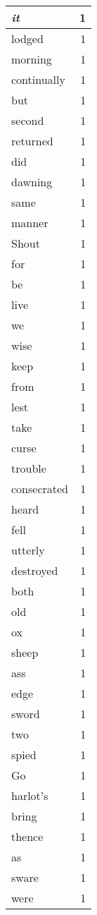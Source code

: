 \begin{center}
\begin{longtable}{l|r}
\emph{it} & 1 \\ \hline
lodged & 1 \\ \hline
morning & 1 \\ \hline
continually & 1 \\ \hline
but & 1 \\ \hline
second & 1 \\ \hline
returned & 1 \\ \hline
did & 1 \\ \hline
dawning & 1 \\ \hline
same & 1 \\ \hline
manner & 1 \\ \hline
Shout & 1 \\ \hline
for & 1 \\ \hline
be & 1 \\ \hline
live & 1 \\ \hline
we & 1 \\ \hline
wise & 1 \\ \hline
keep & 1 \\ \hline
from & 1 \\ \hline
lest & 1 \\ \hline
take & 1 \\ \hline
curse & 1 \\ \hline
trouble & 1 \\ \hline
consecrated & 1 \\ \hline
heard & 1 \\ \hline
fell & 1 \\ \hline
utterly & 1 \\ \hline
destroyed & 1 \\ \hline
both & 1 \\ \hline
old & 1 \\ \hline
ox & 1 \\ \hline
sheep & 1 \\ \hline
ass & 1 \\ \hline
edge & 1 \\ \hline
sword & 1 \\ \hline
two & 1 \\ \hline
spied & 1 \\ \hline
Go & 1 \\ \hline
harlot's & 1 \\ \hline
bring & 1 \\ \hline
thence & 1 \\ \hline
as & 1 \\ \hline
sware & 1 \\ \hline
were & 1 \\ \hline

\end{longtable}
\end{center}
